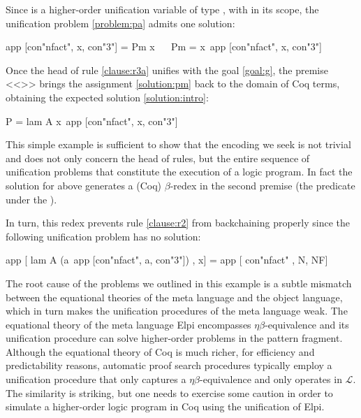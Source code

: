 \documentclass[sigconf,natbib=false,review]{acmart}
\newcommand{\llambda}{\ensuremath{\mathcal{L}}\xspace}
\begin{document}
\noindent
Since  is a higher-order unification variable
of type ,
with 
in its scope, the unification problem \ref{problem:pa}
admits one solution:

\begin{elpicode}
app [con"nfact", x, con"3"] = Pm x                    ~~
Pm = x\ app [con"nfact", x, con"3"]                   ~~
\end{elpicode}

\noindent
Once the head of rule \ref{clause:r3a} unifies with the goal \ref{goal:g},
the premise <<>> brings the assignment \ref{solution:pm}
back to the domain  of Coq terms, obtaining the expected solution
\ref{solution:intro}:

\begin{elpicode}
P = lam A x\ app [con"nfact", x, con"3"]
\end{elpicode}

\noindent
This simple example is sufficient to show that the encoding we seek
is not trivial and does not only concern the head of rules, but the entire sequence
of unification problems that constitute the execution of a logic program.
In fact
the solution for  above generates a
(Coq) $\beta$-redex in the second premise (the predicate
under the \hspace{-0.4em}).


In turn, this redex prevents rule \ref{clause:r2} from backchaining properly since
the following unification problem has no solution:

\begin{elpicode}
app [ lam A (a\ app [con"nfact", a, con"3"]) , x] =
app [ con"nfact"                             , N, NF]
\end{elpicode}

\noindent
The root cause of the problems we outlined in this example
is a subtle mismatch between the equational theories of the meta language
and the object language, which in turn makes the 
unification procedures of the meta language weak.
The equational theory of the meta language Elpi encompasses
$\eta\beta$-equivalence and its unification procedure can solve higher-order
problems in the pattern fragment. Although 
the equational theory of Coq is much richer, for efficiency and predictability
reasons, automatic proof search procedures typically employ a unification
procedure that only captures a $\eta\beta$-equivalence and only operates
in \llambda. The similarity is striking, but one needs to exercise some caution in order to
simulate a higher-order logic program in Coq using the unification of Elpi.
\end{document}
